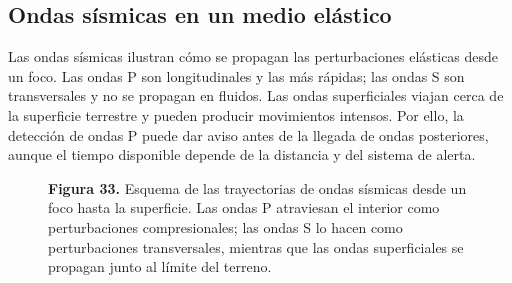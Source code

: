 \subsection{Ondas sísmicas en un medio elástico}

Las ondas sísmicas ilustran cómo se propagan las perturbaciones elásticas desde un foco. Las ondas P son longitudinales y las más rápidas; las ondas S son transversales y no se propagan en fluidos. Las ondas superficiales viajan cerca de la superficie terrestre y pueden producir movimientos intensos. Por ello, la detección de ondas P puede dar aviso antes de la llegada de ondas posteriores, aunque el tiempo disponible depende de la distancia y del sistema de alerta.

\begin{figure}[H]
\centering

\par\medskip
\textbf{Figura 33.} Esquema de las trayectorias de ondas sísmicas desde un foco hasta la superficie. Las ondas P atraviesan el interior como perturbaciones compresionales; las ondas S lo hacen como perturbaciones transversales, mientras que las ondas superficiales se propagan junto al límite del terreno.
\end{figure}